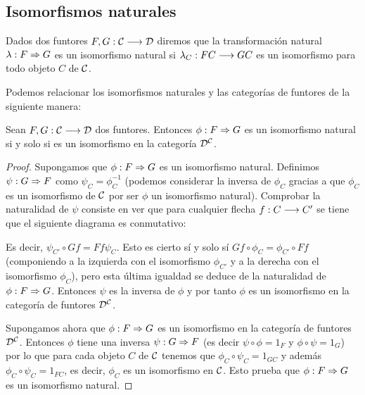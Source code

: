 \subsection{Isomorfismos naturales}
\begin{definition}
  Dados dos funtores $F, G : \mathcal{C}\longrightarrow \mathcal{D}$ diremos que la transformación
  natural $\lambda : F\Rightarrow G$ es un isomorfismo natural si
  $\lambda_C : FC\longrightarrow GC$ es un isomorfismo para todo objeto $C$
  de $\mathcal{C}$.
\end{definition}
Podemos relacionar los isomorfismos naturales y las categorías
de funtores de la siguiente manera:
\begin{proposition}
  Sean $F, G : \mathcal{C}\longrightarrow \mathcal{D}$ dos funtores. Entonces
  $\phi: F\Rightarrow G$
  es un isomorfismo natural si y solo si es un isomorfismo
  en la categoría $\mathcal{D}^{\mathcal{C}}$.
\end{proposition}
\begin{proof}
  Supongamos que $\phi: F\Rightarrow G$ es un isomorfismo natural. Definimos
  $\psi: G\Rightarrow F$ como $\psi_C = \phi_C^{-1}$ (podemos
  considerar la inversa de $\phi_C$ gracias a que $\phi_C$ es un isomorfismo de
  $\mathcal{C}$ por ser $\phi$ un isomorfismo natural). Comprobar la
  naturalidad de $\psi$ consiste en ver que para cualquier
  flecha $f: C\longrightarrow C'$ se tiene que el siguiente diagrama es
  conmutativo:
  \begin{center}
  \end{center}
  Es decir, $\psi_{C'} \circ Gf = Ff \psi_C$. Esto es cierto sí y solo
  sí $Gf \circ \phi_C = \phi_{C'} \circ Ff$ (componiendo a la izquierda
  con el isomorfismo $\phi_{C'}$ y a la derecha con el isomorfismo
  $\phi_C$), pero esta última igualdad se deduce de la naturalidad
  de $\phi: F\Rightarrow G$. Entonces
  $\psi$ es la inversa de $\phi$ y por tanto
  $\phi$ es un isomorfismo en la categoría de funtores
  $\mathcal{D}^{\mathcal{C}}$.


  Supongamos ahora que $\phi: F\Rightarrow G$ es un isomorfismo en la
  categoría de funtores $\mathcal{D}^{\mathcal{C}}$. Entonces $\phi$ tiene
  una inversa $\psi: G\Rightarrow F$ (es decir
  $\psi \circ \phi = 1_F$ y $\phi \circ \psi = 1_G$)
  por lo que para cada objeto
  $C$ de $\mathcal{C}$ tenemos que $\phi_C \circ \psi_C = 1_{GC}$ y
  además $\phi_C \circ \psi_C = 1_{FC}$, es decir, $\phi_C$
  es un isomorfismo en $\mathcal{C}$. Esto prueba que
  $\phi: F\Rightarrow G$ es un isomorfismo natural.
\end{proof}

